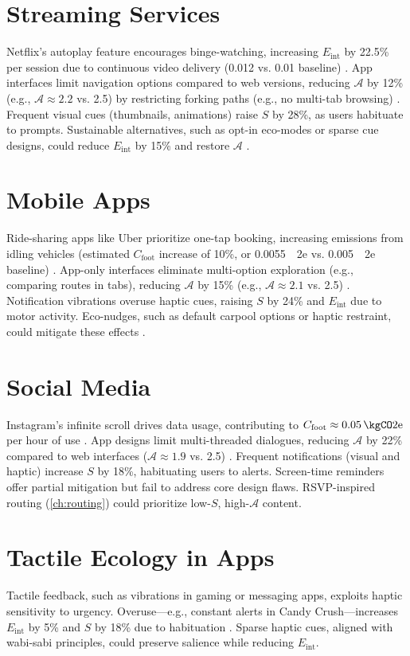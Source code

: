 \documentclass[openany]{book}
\newcommand{\Sent}{S} %
\newcommand{\Eint}{E_{\mathrm{int}}} %
\newcommand{\Cfoot}{C_{\mathrm{foot}}} %
\newcommand{\Auton}{\mathcal{A}} %
\newcommand{\kWh}{\mathrm{kWh}}
\begin{document}
\section{Streaming Services}
\label{sec:cases-streaming}
Netflix’s autoplay feature encourages binge-watching, increasing $\Eint$ by 22.5\% per session due to continuous video delivery (\SI{0.012}{\kWh} vs. \SI{0.01}{\kWh} baseline) \citep{colak2024}. App interfaces limit navigation options compared to web versions, reducing $\Auton$ by 12\% (e.g., $\Auton \approx 2.2$ vs. 2.5) by restricting forking paths (e.g., no multi-tab browsing) \citep{doctorow2022}. Frequent visual cues (thumbnails, animations) raise $\Sent$ by 28\%, as users habituate to prompts. Sustainable alternatives, such as opt-in eco-modes or sparse cue designs, could reduce $\Eint$ by 15\% and restore $\Auton$ \citep{extentia2024}.

\section{Mobile Apps}
\label{sec:cases-apps}
Ride-sharing apps like Uber prioritize one-tap booking, increasing emissions from idling vehicles (estimated $\Cfoot$ increase of 10\%, or \SI{0.0055}{\kgCO2e} vs. \SI{0.005}{\kgCO2e} baseline) \citep{colak2024}. App-only interfaces eliminate multi-option exploration (e.g., comparing routes in tabs), reducing $\Auton$ by 15\% (e.g., $\Auton \approx 2.1$ vs. 2.5) \citep{doctorow2022}. Notification vibrations overuse haptic cues, raising $\Sent$ by 24\% and $\Eint$ due to motor activity. Eco-nudges, such as default carpool options or haptic restraint, could mitigate these effects \citep{colak2024}.

\section{Social Media}
\label{sec:cases-social}
Instagram’s infinite scroll drives data usage, contributing to $\Cfoot \approx \SI{0.05}{\kgCO2e}$ per hour of use \citep{designlab2024}. App designs limit multi-threaded dialogues, reducing $\Auton$ by 22\% compared to web interfaces ($\Auton \approx 1.9$ vs. 2.5) \citep{doctorow2022}. Frequent notifications (visual and haptic) increase $\Sent$ by 18\%, habituating users to alerts. Screen-time reminders offer partial mitigation but fail to address core design flaws. RSVP-inspired routing (\cref{ch:routing}) could prioritize low-$\Sent$, high-$\Auton$ content.

\section{Tactile Ecology in Apps}
\label{sec:cases-tactile}
Tactile feedback, such as vibrations in gaming or messaging apps, exploits haptic sensitivity to urgency. Overuse---e.g., constant alerts in Candy Crush---increases $\Eint$ by 5\% and $\Sent$ by 18\% due to habituation \citep{gallace2006}. Sparse haptic cues, aligned with wabi-sabi principles, could preserve salience while reducing $\Eint$.
\end{document}

